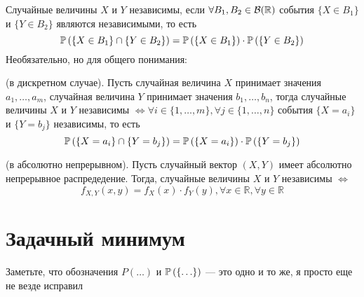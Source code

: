 \documentclass{article}
\begin{document}
 Случайные величины $X$ и $Y$ независимы, если $\forall B_1,B_2\in\mathcal{B}(\mathbb{R})$ события $\{X\in B_1\}$ и $\{Y\in B_2\}$ являются независимыми, то есть
\begin{equation*}
    \mathbb{P}\left(\{X\in B_1\}\cap\{Y\in B_2\}\right)=\mathbb{P}\left(\{X\in B_1\}\right)\cdot\mathbb{P}\left(\{Y\in B_2\}\right)
\end{equation*}
Необязательно, но для общего понимания:

\theorem (в дискретном случае). Пусть случайная величина $X$ принимает значения $a_1,\ldots,a_m$, случайная величина $Y$ принимает значения $b_1,\ldots,b_n$, тогда случайные величины $X$ и $Y$ независимы $\Longleftrightarrow \forall i\in\{1,\ldots,m\},\forall j\in\{1,\ldots,n\}$ события $\{X=a_i\}$ и $\{Y=b_j\}$ независимы, то есть
\begin{equation*}
    \mathbb{P}\left(\{X=a_i\}\cap\{Y=b_j\}\right)=\mathbb{P}\left(\{X=a_i\}\right)\cdot\mathbb{P}\left(\{Y=b_j\}\right)
\end{equation*}

\theorem (в абсолютно непрерывном). Пусть случайный вектор $(X,Y)$ имеет абсолютно непрерывное распредедение. Тогда, случайные величины $X$ и $Y$ независимы $\Longleftrightarrow$
\begin{equation*}
    f_{X,Y}(x,y)=f_X(x)\cdot f_{Y}(y),\forall x\in\mathbb{R},\forall y\in\mathbb{R}
\end{equation*}

    



\newpage
\section{Задачный минимум}
Заметьте, что обозначения $P(\ldots)$ и $\mathbb{P}\left(\{\ldots\}\right)$ — это одно и то же, я просто еще не везде исправил
\end{document}
